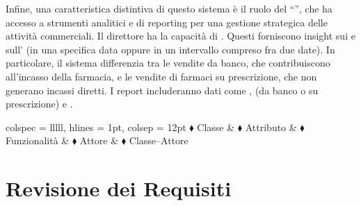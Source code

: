 \noindent Infine, una caratteristica distintiva di questo sistema è il ruolo del ``'', che ha accesso a strumenti analitici e di reporting per una gestione strategica delle attività commerciali. Il direttore ha la capacità di . Questi  forniscono insight sui  e sull' (in una specifica data oppure in un intervallo compreso fra due date). In particolare, il sistema differenzia tra le vendite da banco, che contribuiscono all'incasso della farmacia, e le vendite di farmaci su prescrizione, che non generano incassi diretti. I report includeranno dati come ,  (da banco o su prescrizione) e .

\begin{table}[h]
	\centering
	\begin{tblr}{
		colspec = lllll,
		hlines = {1pt}, colsep = 12pt
		}
		\textcolor{ColorClass}{$\blacklozenge$} Classe &
		\textcolor{ColorAttr}{$\blacklozenge$} Attributo &
		\textcolor{ColorFunc}{$\blacklozenge$} Funzionalità &
		\textcolor{ColorActor}{$\blacklozenge$} Attore &
		\textcolor{ColorClassActor}{$\blacklozenge$} Classe--Attore \\
	\end{tblr}
\end{table}

\section{Revisione dei Requisiti}

